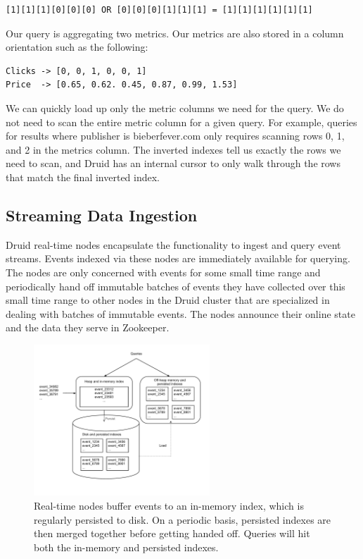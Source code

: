\documentclass{vldb}
\begin{document}
{\small\begin{verbatim}
[1][1][1][0][0][0] OR [0][0][0][1][1][1] = [1][1][1][1][1][1]
\end{verbatim}}

Our query is aggregating two metrics. Our metrics are also stored in a column
orientation such as the following:

{\small\begin{verbatim}
Clicks -> [0, 0, 1, 0, 0, 1]
Price  -> [0.65, 0.62. 0.45, 0.87, 0.99, 1.53]
\end{verbatim}}

We can quickly load up only the metric columns we need for the query. We do not
need to scan the entire metric column for a given query. For example, queries
for results where publisher is bieberfever.com only requires scanning rows 0,
1, and 2 in the metrics column. The inverted indexes tell us exactly the rows
we need to scan, and Druid has an internal cursor to only walk through the rows
that match the final inverted index.

\subsection{Streaming Data Ingestion}
Druid real-time nodes encapsulate the functionality to ingest and query event
streams. Events indexed via these nodes are immediately available for querying.
The nodes are only concerned with events for some small time range and
periodically hand off immutable batches of events they have collected over this
small time range to other nodes in the Druid cluster that are specialized in
dealing with batches of immutable events. The nodes announce their online state
and the data they serve in Zookeeper\cite{hunt2010zookeeper}.

\begin{figure}
\centering
\includegraphics[width = 2.6in]{realtime_flow}
\caption{Real-time nodes buffer events to an in-memory index, which is
regularly persisted to disk. On a periodic basis, persisted indexes are then merged
together before getting handed off.
Queries will hit both the in-memory and persisted indexes.
}
\label{fig:realtime_flow}
\end{figure}
\end{document}
